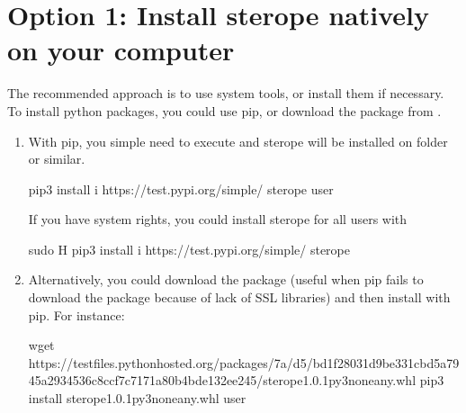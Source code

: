 \documentclass[letterpaper,10pt,english]{sphinxmanual}
\begin{document}
\section{Option 1: Install sterope natively on your computer}
\label{\detokenize{Installation:option-1-install-sterope-natively-on-your-computer}}
The recommended approach is to use system tools, or install them if
necessary. To install python packages, you could use pip, or download
the package from .
\begin{enumerate}
\def\theenumi{\arabic{enumi}}
\def\labelenumi{\theenumi .}
\makeatletter\def\p@enumii{\p@enumi \theenumi .}\makeatother
\item {} 

With pip, you simple need to execute and sterope will be installed on
 folder or similar.

\begin{sphinxVerbatim}[commandchars=\\\{\}]
pip3 install \PYGZhy{}i https://test.pypi.org/simple/ sterope \PYGZhy{}\PYGZhy{}user
\end{sphinxVerbatim}

If you have system rights, you could install sterope for all users with

\begin{sphinxVerbatim}[commandchars=\\\{\}]
sudo \PYGZhy{}H pip3 install \PYGZhy{}i https://test.pypi.org/simple/ sterope
\end{sphinxVerbatim}

\item {} 

Alternatively, you could download the package (useful when pip fails to
download the package because of lack of SSL libraries) and then install with pip.
For instance:

\begin{sphinxVerbatim}[commandchars=\\\{\}]
wget https://test\PYGZhy{}files.pythonhosted.org/packages/7a/d5/bd1f28031d9be331cbd5a7945a2934536c8ccf7c7171a80b4bde132ee245/sterope\PYGZhy{}1.0.1\PYGZhy{}py3\PYGZhy{}none\PYGZhy{}any.whl
pip3 install sterope\PYGZhy{}1.0.1\PYGZhy{}py3\PYGZhy{}none\PYGZhy{}any.whl \PYGZhy{}\PYGZhy{}user
\end{sphinxVerbatim}


\end{enumerate}
\end{document}
